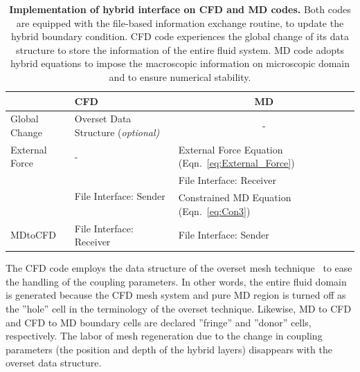 \documentclass[preprint,12pt]{elsarticle}
\begin{document}
\begin{table}
  \caption{\small
{\bf Implementation of hybrid interface on CFD and MD codes.} Both codes are equipped with the file-based information exchange routine, to update the hybrid boundary condition. CFD code experiences the global change of its data structure to store the information of the entire fluid system. MD code adopts 
hybrid equations to impose the macroscopic information on microscopic domain and to ensure numerical stability. 
}
  \label{table:interface_implementation}
  \centering
\footnotesize
 \begin{tabular}{>{\centering}p{} || p{} | p{} }
\hline
  & \centering CFD & \multicolumn{1}{c}{MD} \\
\hline
 Global Change & Overset Data Structure (\it{optional}) & \multicolumn{1}{c}{-} \\
\hline
 \centering External Force & \centering - & External Force Equation (Eqn.~\ref{eq:External_Force}) \\
\hline
 \multirow{2}{*}{CFDtoMD} &  \multirow{2}{*}{File Interface: Sender} & {File Interface: Receiver} \\
 & & Constrained MD Equation (Eqn.~\ref{eq:Con3}) \\
\hline
 MDtoCFD & File Interface: Receiver & File Interface: Sender \\
\hline
\end{tabular} %
\vspace{-1em}
\end{table}



The CFD code employs the data structure of the overset mesh technique~\cite{Chimera}  to ease the handling of the coupling parameters. In other words, the entire fluid domain is generated because the CFD mesh system and pure MD region is turned off as the ''hole'' cell in the terminology of the overset technique. Likewise, MD to CFD and CFD to MD boundary cells are declared ''fringe'' and ''donor'' cells, respectively. The labor of mesh regeneration due to the change in coupling parameters (the position and depth of the hybrid layers) disappears with the overset data structure.
\end{document}
